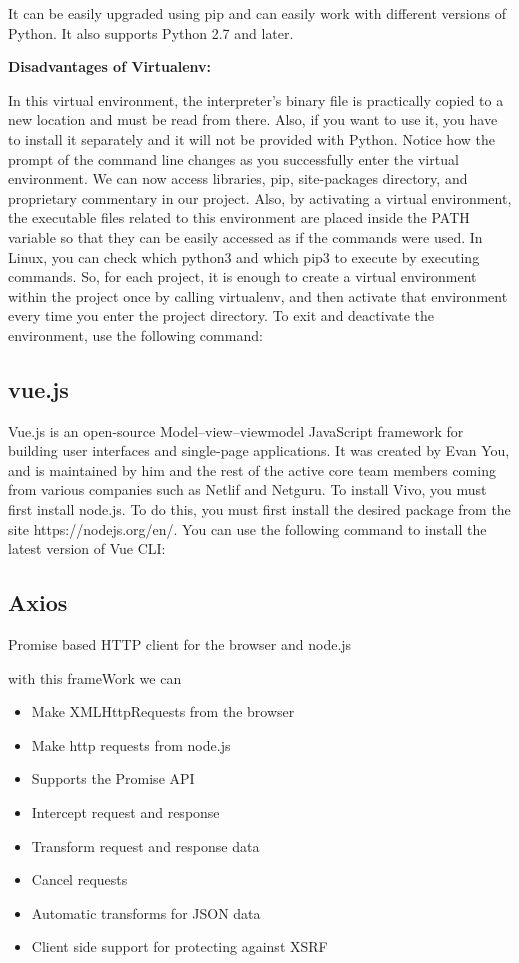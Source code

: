 It can be easily upgraded using pip and can easily work with different versions of Python. It also supports Python 2.7 and later.

\textbf{Disadvantages of Virtualenv:}

In this virtual environment, the interpreter's binary file is practically copied to a new location and must be read from there. Also, if you want to use it, you have to install it separately and it will not be provided with Python.
Notice how the prompt of the command line changes as you successfully enter the virtual environment.
We can now access libraries, pip, site-packages directory, and proprietary commentary in our project. Also, by activating a virtual environment, the executable files related to this environment are placed inside the PATH variable so that they can be easily accessed as if the commands were used.
In Linux, you can check which python3 and which pip3 to execute by executing commands.
So, for each project, it is enough to create a virtual environment within the project once by calling virtualenv, and then activate that environment every time you enter the project directory.
To exit and deactivate the environment, use the following command:


\subsection{vue.js}
Vue.js is an open-source Model–view–viewmodel JavaScript framework for building user interfaces and single-page applications.
It was created by Evan You, and is maintained by him and the rest of the active core team members coming from various companies such as Netlif and Netguru.\textcite{wiki:Vue.js}
To install Vivo, you must first install node.js. To do this, you must first install the desired package from the site https://nodejs.org/en/. You can use the following command to install the latest version of Vue CLI: \newline

\newline

\subsection{Axios}
Promise based HTTP client for the browser and node.js\textcite{axios}

with this frameWork we can
\begin{itemize}
\item Make XMLHttpRequests from the browser
\item Make http requests from node.js
\item Supports the Promise API
\item Intercept request and response
\item Transform request and response data
\item Cancel requests
\item Automatic transforms for JSON data
\item Client side support for protecting against XSRF
\end{itemize}

